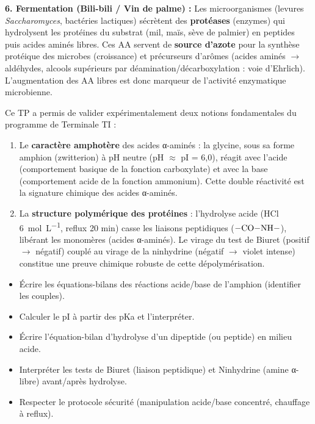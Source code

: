 \documentclass[11pt]{article}
\newcounter{popsec}
\newcounter{popsub}
\newcommand{\courssub}[1]{%
  \stepcounter{popsub}%
  \par\vspace{9pt}\noindent{\popxbold\fontsize{11.5}{13}\selectfont\color{popink}{\color{poporange}\thepopsec.\thepopsub}\hspace{6pt}#1}\par\nopagebreak\vspace{4pt}
}
\begin{document}
\begin{exoresolu}
\textbf{6. Fermentation (Bili-bili / Vin de palme) :}
Les microorganismes (levures \emph{Saccharomyces}, bactéries lactiques) sécrètent des \textbf{protéases} (enzymes) qui hydrolysent les protéines du substrat (mil, maïs, sève de palmier) en peptides puis acides aminés libres. Ces AA servent de \textbf{source d'azote} pour la synthèse protéique des microbes (croissance) et précurseurs d'arômes (acides aminés $\to$ aldéhydes, alcools supérieurs par déamination/décarboxylation : voie d'Ehrlich). L'augmentation des AA libres est donc marqueur de l'activité enzymatique microbienne.
\end{exoresolu}

\courssub{Conclusion}
Ce TP a permis de valider expérimentalement deux notions fondamentales du programme de Terminale TI :
\begin{enumerate}
    \item Le \textbf{caractère amphotère} des acides α-aminés : la glycine, sous sa forme amphion (zwitterion) à pH neutre (pH $\approx$ pI = 6,0), réagit avec l'acide (comportement basique de la fonction carboxylate) et avec la base (comportement acide de la fonction ammonium). Cette double réactivité est la signature chimique des acides α-aminés.
    \item La \textbf{structure polymérique des protéines} : l'hydrolyse acide (HCl \SI{6}{mol.L^{-1}}, reflux 20 min) casse les liaisons peptidiques ($\ce{-CO-NH-}$), libérant les monomères (acides α-aminés). Le virage du test de Biuret (positif $\to$ négatif) couplé au virage de la ninhydrine (négatif $\to$ violet intense) constitue une preuve chimique robuste de cette dépolymérisation.
\end{enumerate}
\begin{aretenir}
\begin{itemize}
    \item Écrire les équations-bilans des réactions acide/base de l'amphion (identifier les couples).
    \item Calculer le pI à partir des pKa et l'interpréter.
    \item Écrire l'équation-bilan d'hydrolyse d'un dipeptide (ou peptide) en milieu acide.
    \item Interpréter les tests de Biuret (liaison peptidique) et Ninhydrine (amine α-libre) avant/après hydrolyse.
    \item Respecter le protocole sécurité (manipulation acide/base concentré, chauffage à reflux).
\end{itemize}
\end{aretenir}
\end{document}
